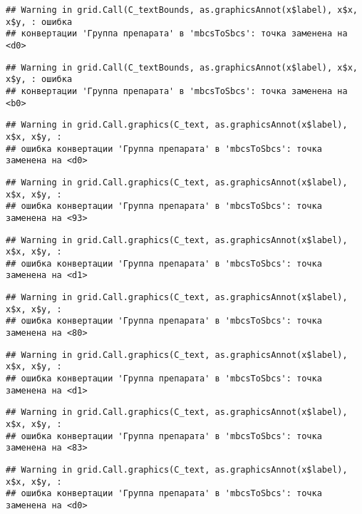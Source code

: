 \documentclass[
]{article}
\begin{document}
\begin{verbatim}
## Warning in grid.Call(C_textBounds, as.graphicsAnnot(x$label), x$x, x$y, : ошибка
## конвертации 'Группа препарата' в 'mbcsToSbcs': точка заменена на <d0>
\end{verbatim}

\begin{verbatim}
## Warning in grid.Call(C_textBounds, as.graphicsAnnot(x$label), x$x, x$y, : ошибка
## конвертации 'Группа препарата' в 'mbcsToSbcs': точка заменена на <b0>
\end{verbatim}

\begin{verbatim}
## Warning in grid.Call.graphics(C_text, as.graphicsAnnot(x$label), x$x, x$y, :
## ошибка конвертации 'Группа препарата' в 'mbcsToSbcs': точка заменена на <d0>
\end{verbatim}

\begin{verbatim}
## Warning in grid.Call.graphics(C_text, as.graphicsAnnot(x$label), x$x, x$y, :
## ошибка конвертации 'Группа препарата' в 'mbcsToSbcs': точка заменена на <93>
\end{verbatim}

\begin{verbatim}
## Warning in grid.Call.graphics(C_text, as.graphicsAnnot(x$label), x$x, x$y, :
## ошибка конвертации 'Группа препарата' в 'mbcsToSbcs': точка заменена на <d1>
\end{verbatim}

\begin{verbatim}
## Warning in grid.Call.graphics(C_text, as.graphicsAnnot(x$label), x$x, x$y, :
## ошибка конвертации 'Группа препарата' в 'mbcsToSbcs': точка заменена на <80>
\end{verbatim}

\begin{verbatim}
## Warning in grid.Call.graphics(C_text, as.graphicsAnnot(x$label), x$x, x$y, :
## ошибка конвертации 'Группа препарата' в 'mbcsToSbcs': точка заменена на <d1>
\end{verbatim}

\begin{verbatim}
## Warning in grid.Call.graphics(C_text, as.graphicsAnnot(x$label), x$x, x$y, :
## ошибка конвертации 'Группа препарата' в 'mbcsToSbcs': точка заменена на <83>
\end{verbatim}

\begin{verbatim}
## Warning in grid.Call.graphics(C_text, as.graphicsAnnot(x$label), x$x, x$y, :
## ошибка конвертации 'Группа препарата' в 'mbcsToSbcs': точка заменена на <d0>
\end{verbatim}
\end{document}
